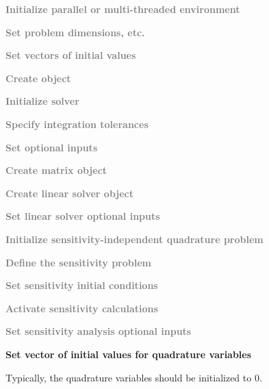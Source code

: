 \begin{Steps}
  
\item 
  \textcolor{gray}{\bf Initialize parallel or multi-threaded environment}

\item
  \textcolor{gray}{\bf Set problem dimensions, etc.}

\item
  \textcolor{gray}{\bf Set vectors of initial values}
 
\item
  \textcolor{gray}{\bf Create {\idas} object}

\item
  \textcolor{gray}{\bf Initialize {\idas} solver}

\item
  \textcolor{gray}{\bf Specify integration tolerances}

\item
  \textcolor{gray}{\bf Set optional inputs}

\item
  \textcolor{gray}{\bf Create matrix object}

\item
  \textcolor{gray}{\bf Create linear solver object}

\item
  \textcolor{gray}{\bf Set linear solver optional inputs}

\item
  \textcolor{gray}{\bf Initialize sensitivity-independent quadrature problem}

\item\label{i:quad_sens_sens_def}
  \textcolor{gray}{\bf Define the sensitivity problem}

\item
  \textcolor{gray}{\bf Set sensitivity initial conditions}

\item
  \textcolor{gray}{\bf Activate sensitivity calculations}

\item
  \textcolor{gray}{\bf Set sensitivity analysis optional inputs}

\item
  {\bf Set vector of initial values for quadrature variables}

  Typically, the quadrature variables should be initialized to $0$.


\end{Steps}

